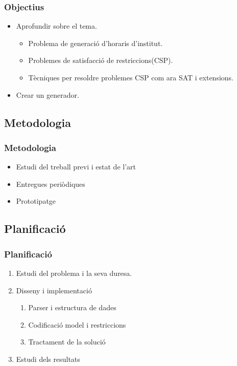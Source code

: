 \documentclass[11pt]{beamer}
\begin{document}
  \begin{frame}
    \frametitle{Objectius}

    \begin{itemize}
    
      \item Aprofundir sobre el tema.
       \begin{itemize}
        \item Problema de generació d'horaris d'institut.
        \item Problemes de satisfacció de restriccions(CSP).
        \item Tècniques per resoldre problemes CSP com ara SAT i extensions.
       \end{itemize}
      \item Crear un generador.
    
    \end{itemize}
          
  \end{frame}
  
  \subsection{Metodologia}
  \begin{frame}
    \frametitle{Metodologia}
    \begin{itemize}
      \item Estudi del treball previ i estat de l'art
      \item Entregues periòdiques
      \item Prototipatge
    \end{itemize}

  \end{frame}

  \subsection{Planificació}
  \begin{frame}
    \frametitle{Planificació}
    \begin{enumerate}
      \item Estudi del problema i la seva duresa.
      \item Disseny i implementació
      \begin{enumerate}
        \item Parser i estructura de dades
        \item Codificació model i restriccions
        \item Tractament de la solució
      \end{enumerate}
      \item Estudi dels resultats
        \end{enumerate}

  \end{frame}
\end{document}
